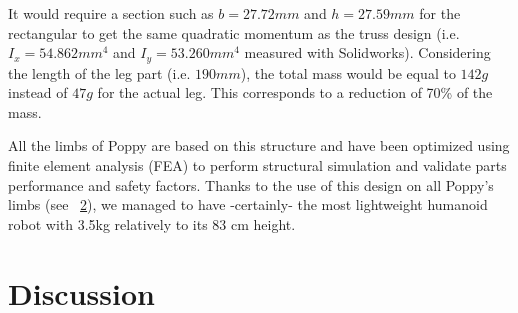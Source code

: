 \begin{figure}[!h]
\centering
    \hfil
    \caption{}
    \label{fig:leg_section}
\end{figure}

It would require a section such as $b=27.72 mm$ and $h=27.59 mm$ for the rectangular to get the same quadratic momentum as the truss design (i.e. $I_x = 54.862 mm^4$ and $I_y = 53.260 mm^4$ measured with Solidworks).
Considering the length of the leg part (i.e. $190 mm$), the total mass would be equal to $142 g$ instead of $47 g$ for the actual leg. This corresponds to a reduction of 70\% of the mass.

\begin{figure}[!h]
\centering


    \caption{}
    \label{fig:poppy_truss_structure}
\end{figure}

All the limbs of Poppy are based on this structure and have been optimized using finite element analysis (FEA) to perform structural simulation and validate parts performance and safety factors.
Thanks to the use of this design on all Poppy's limbs (see \figurename~\ref{fig:poppy_truss_structure}), we managed to have -certainly- the most lightweight humanoid robot with 3.5kg relatively to its 83 cm height.








% 



\clearpage
\section{Discussion} %

